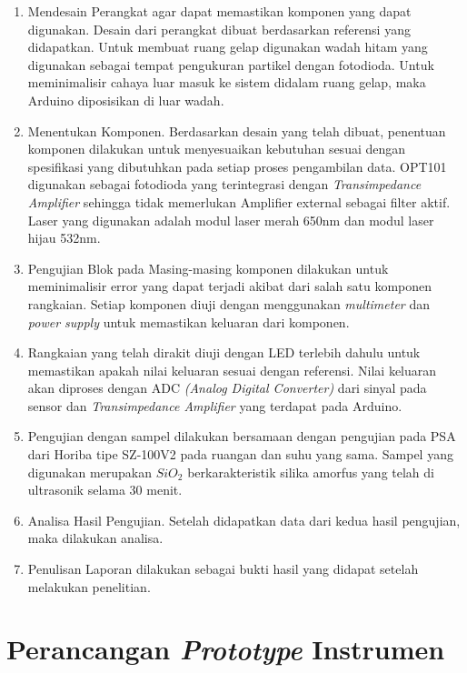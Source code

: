 \begin{enumerate}
    \item Mendesain Perangkat agar dapat memastikan komponen yang dapat digunakan. Desain dari
    perangkat dibuat berdasarkan referensi yang didapatkan. Untuk membuat ruang gelap digunakan
    wadah hitam yang digunakan sebagai tempat pengukuran partikel dengan fotodioda. Untuk
    meminimalisir cahaya luar masuk ke sistem didalam ruang gelap, maka Arduino diposisikan
    di luar wadah.
    \item Menentukan Komponen. Berdasarkan desain yang telah dibuat, penentuan komponen dilakukan
    untuk menyesuaikan kebutuhan sesuai dengan spesifikasi yang dibutuhkan pada setiap proses
    pengambilan data. OPT101 digunakan sebagai fotodioda yang terintegrasi dengan
    \textit{Transimpedance Amplifier} sehingga tidak memerlukan Amplifier external sebagai filter
    aktif. Laser yang digunakan adalah modul laser merah 650nm dan modul laser hijau 532nm.
    \item Pengujian Blok pada Masing-masing komponen dilakukan untuk meminimalisir error yang
    dapat terjadi akibat dari salah satu komponen rangkaian. Setiap komponen diuji dengan
    menggunakan \textit{multimeter} dan \textit{power supply} untuk memastikan keluaran dari
    komponen.
    \item Rangkaian yang telah dirakit diuji dengan LED terlebih dahulu untuk memastikan
    apakah nilai keluaran sesuai dengan referensi. Nilai keluaran akan diproses dengan ADC
    \textit{(Analog Digital Converter)} dari sinyal pada sensor dan \textit{Transimpedance Amplifier}
    yang terdapat pada Arduino.
    \item Pengujian dengan sampel dilakukan bersamaan dengan pengujian pada PSA dari Horiba
    tipe SZ-100V2 pada ruangan
    dan suhu yang sama. Sampel yang digunakan merupakan ${SiO_2}$\cite{MadeJoni2020}
    berkarakteristik silika amorfus yang telah di ultrasonik selama 30 menit.
    \item Analisa Hasil Pengujian. Setelah didapatkan data dari kedua hasil pengujian, maka dilakukan
    analisa.
    \item Penulisan Laporan dilakukan sebagai bukti hasil yang didapat setelah melakukan penelitian.

\end{enumerate}


\section{Perancangan \textit{Prototype} Instrumen}

